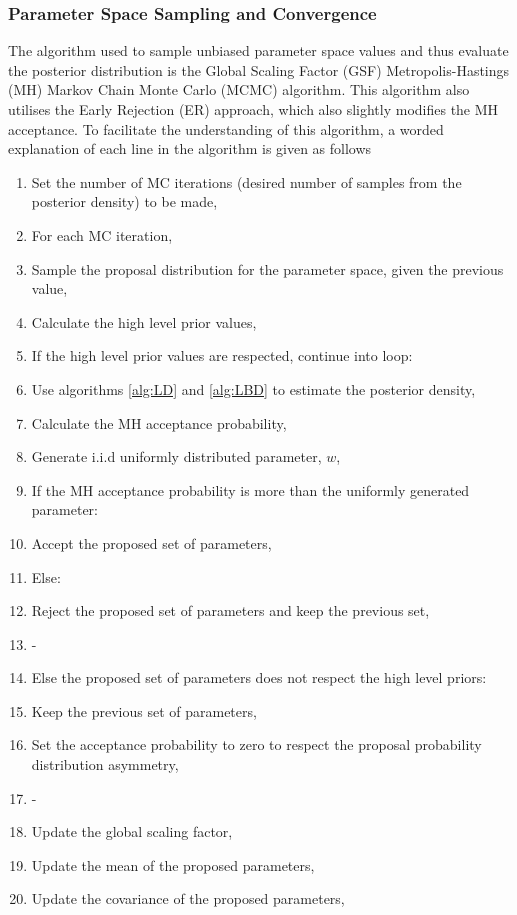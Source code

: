 \documentclass[10pt,a4paper]{article}
\begin{document}
\begin{multicols}{1}
\subsubsection{Parameter Space Sampling and Convergence}\label{sec:GSFMH}
The algorithm used to sample unbiased parameter space values and thus evaluate the posterior distribution is the Global Scaling Factor (GSF) Metropolis-Hastings (MH) Markov Chain Monte Carlo (MCMC) algorithm. This algorithm also utilises the Early Rejection (ER) approach, which also slightly modifies the MH acceptance. To facilitate the understanding of this algorithm, a worded explanation of each line in the algorithm is given as follows
\begin{enumerate}
\item Set the number of MC iterations (desired number of samples from the posterior density) to be made,
\item For each MC iteration,
\item Sample the proposal distribution for the parameter space, given the previous value,
\item Calculate the high level prior values,
\item If the high level prior values are respected, continue into loop:
\item Use algorithms \ref{alg:LD} and \ref{alg:LBD} to estimate the posterior density,
\item Calculate the MH acceptance probability,
\item Generate i.i.d uniformly distributed parameter, $w$,
\item If the MH acceptance probability is more than the uniformly generated parameter:
\item Accept the proposed set of parameters,
\item Else:
\item Reject the proposed set of parameters and keep the previous set,
\item -
\item Else the proposed set of parameters does not respect the high level priors:
\item Keep the previous set of parameters,
\item Set the acceptance probability to zero to respect the proposal probability distribution asymmetry,
\item -
\item Update the global scaling factor,
\item Update the mean of the proposed parameters,
\item Update the covariance of the proposed parameters,

\end{enumerate}
\end{multicols}
\end{document}
